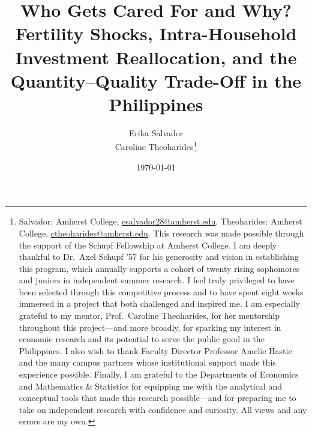 \documentclass[]{AEA}
\begin{document}
\title{Who Gets Cared For and Why? Fertility Shocks, Intra-Household
Investment Reallocation, and the Quantity--Quality Trade-Off in the
Philippines}


\author{
  Erika Salvador\\
  Caroline Theoharides\thanks{
  Salvador: Amherst
College, \href{mailto:esalvador28@amherst.edu}{esalvador28@amherst.edu}.
  Theoharides: Amherst
College, \href{mailto:ctheoharides@amherst.edu}{ctheoharides@amherst.edu}.
  This research was made possible through the support of the Schupf
  Fellowship at Amherst College. I am deeply thankful to Dr.~Axel Schupf
  '57 for his generosity and vision in establishing this program, which
  annually supports a cohort of twenty rising sophomores and juniors in
  independent summer research. I feel truly privileged to have been
  selected through this competitive process and to have spent eight
  weeks immersed in a project that both challenged and inspired me. I am
  especially grateful to my mentor, Prof.~Caroline Theoharides, for her
  mentorship throughout this project---and more broadly, for sparking my
  interest in economic research and its potential to serve the public
  good in the Philippines. I also wish to thank Faculty Director
  Professor Amelie Hastie and the many campus partners whose
  institutional support made this experience possible. Finally, I am
  grateful to the Departments of Economics and Mathematics \& Statistics
  for equipping me with the analytical and conceptual tools that made
  this research possible---and for preparing me to take on independent
  research with confidence and curiosity. All views and any errors are
  my own.
}
}

\date{\today}
\pubVolume{}
\pubIssue{}
\end{document}
